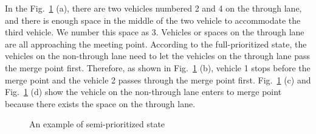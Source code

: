 \documentclass[10pt, conference, compsocconf]{IEEEtran}
\begin{document}
In the Fig.~\ref{space} (a), there are two vehicles numbered 2 and 4 on the through lane, and there is enough space in the middle of the two vehicle to accommodate the third vehicle. We number this space as 3.
Vehicles or spaces on the through lane are all approaching the meeting point.
According to the full-prioritized state, the vehicles on the non-through lane need to let the vehicles on the through lane pass the merge point first. 
Therefore, as shown in Fig.~\ref{space} (b), vehicle 1 stops before the merge point and the vehicle 2 passes through the merge point first.
Fig.~\ref{space} (c) and Fig.~\ref{space} (d) show the vehicle on the non-through lane enters to merge point because there exists the space on the through lane.

\begin{figure}[h]
\begin{center}
\end{center}
\caption{An example of semi-prioritized state}
\label{space}
\end{figure}
 
 
\end{document}
